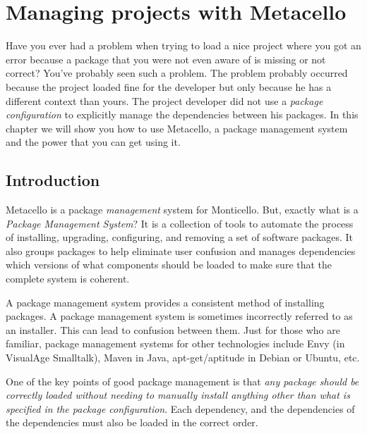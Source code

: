 \documentclass[a4paper,10pt,twoside]{book}
\begin{document}
\fi
\sloppy



\chapter{Managing projects with Metacello}
\chapterauthor{\authordale{} \\ \authormariano{}}

Have you ever had a problem when trying to load a nice project where you got an error because a package that you were not even aware of  is missing or not correct? You've probably seen such a problem. The problem probably occurred because the project loaded fine for the  developer but only because he has a different context than yours. The project developer did not use a \emph{package configuration} to explicitly manage the dependencies between his packages. In this chapter we will show you how to use Metacello, a package management system and the power that you can get using it. 

\section{Introduction}

Metacello is a package \textit{management} system for Monticello. But, exactly what is a \textit{Package Management System}?
It is a collection of tools to automate the process of installing, upgrading, configuring, and removing a set of software packages. It also groups packages to help eliminate user confusion and manages dependencies \ie which versions of what components should be loaded to make sure that the complete system is coherent. 

A package management system provides a consistent method of installing packages. A package management system is sometimes incorrectly referred to as an installer. This can lead to confusion between them. Just for those who are familiar, package management systems for other technologies include Envy (in VisualAge Smalltalk), Maven in Java, apt-get/aptitude in Debian or Ubuntu, etc.

One of the key points of good package management is that \emph{any package should be correctly loaded without needing to manually install anything other than what is specified in the package configuration}. Each dependency, and the dependencies of the dependencies must also be loaded in the correct order. 
\end{document}
